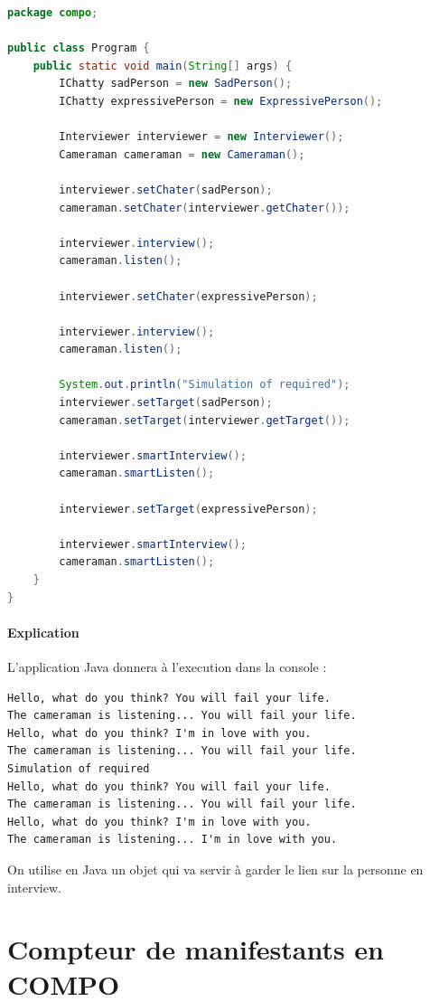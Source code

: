 \documentclass[11pt,a4paper,openany,oneside]{book}
\begin{document}
\begin{appendices}
\clearpage

\begin{lstlisting}[language=Java, frame=single, caption=Program]
package compo;

public class Program {
    public static void main(String[] args) {
        IChatty sadPerson = new SadPerson();
        IChatty expressivePerson = new ExpressivePerson();

        Interviewer interviewer = new Interviewer();
        Cameraman cameraman = new Cameraman();

        interviewer.setChater(sadPerson);
        cameraman.setChater(interviewer.getChater());

        interviewer.interview();
        cameraman.listen();

        interviewer.setChater(expressivePerson);

        interviewer.interview();
        cameraman.listen();

        System.out.println("Simulation of required");
        interviewer.setTarget(sadPerson);
        cameraman.setTarget(interviewer.getTarget());

        interviewer.smartInterview();
        cameraman.smartListen();

        interviewer.setTarget(expressivePerson);

        interviewer.smartInterview();
        cameraman.smartListen();
    }
}
\end{lstlisting}

\subsubsection{Explication}
L'application Java donnera à l'execution dans la console : \begin{lstlisting}[frame=single, caption=output]
Hello, what do you think? You will fail your life. 
The cameraman is listening... You will fail your life.
Hello, what do you think? I'm in love with you. 
The cameraman is listening... You will fail your life. 
Simulation of required 
Hello, what do you think? You will fail your life. 
The cameraman is listening... You will fail your life. 
Hello, what do you think? I'm in love with you. 
The cameraman is listening... I'm in love with you.
\end{lstlisting}
On utilise en Java un objet qui va servir à garder le lien sur la personne en interview.

\chapter{Compteur de manifestants en COMPO}


\end{appendices}
\end{document}
